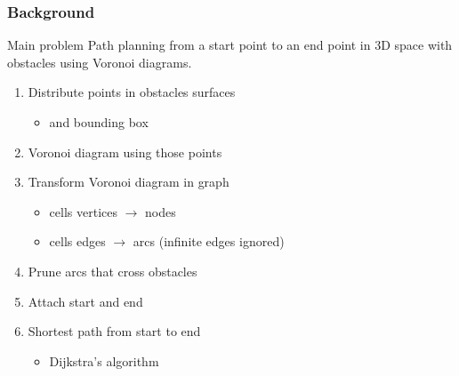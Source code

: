 \begin{frame}
  \frametitle{Background}
  \begin{block}{Main problem}
    \alert{Path planning} from a \alert{start} point to an \alert{end}
    point in 3D space with obstacles using \alert{Voronoi} diagrams.
  \end{block}\pause
  \begin{enumerate}
  \item Distribute \alert{points} in obstacles surfaces
    \begin{itemize}
    \item and bounding box\pause
    \end{itemize}
  \item \alert{Voronoi} diagram using those points\pause
  \item Transform Voronoi diagram in \alert{graph}
    \begin{itemize}
    \item cells \alert{vertices} $\rightarrow$ \alert{nodes}
    \item cells \alert{edges} $\rightarrow$ \alert{arcs} (infinite edges
      ignored)\pause
    \end{itemize}
  \item \alert{Prune} arcs that cross obstacles\pause
  \item Attach \alert{start} and \alert{end}\pause
  \item Shortest path from start to end
    \begin{itemize}
    \item \alert{Dijkstra}'s algorithm
    \end{itemize}
  \end{enumerate}
\end{frame}

